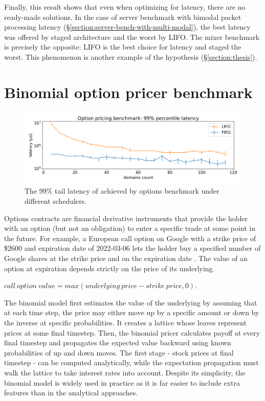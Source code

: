 \documentclass[12pt,a4paper,twoside]{report}
\begin{document}
Finally, this result shows that even when optimizing for latency, there are no ready-made solutions. In the case of server benchmark with bimodal packet processing latency (\S\ref{section:server-bench-with-multi-modal}), the best latency was offered by staged architecture and the worst by LIFO. The mixer benchmark is precisely the opposite: LIFO is the best choice for latency and staged the worst. This phenomenon is another example of the hypothesis (\S\ref{section:thesis}). 

\section{Binomial option pricer benchmark}
\label{section:binomial_option_pricer_result}

\begin{figure} 
    \centering 
    \includegraphics[width=1\textwidth]{eval/options-base.png}
    \caption{The 99\% tail latency of achieved by options benchmark under different schedulers.}
   \label{fig:options-bench}
\end{figure}
Options contracts are financial derivative instruments that provide the holder with an option (but not an obligation) to enter a specific trade at some point in the future. For example, a European call option on Google with a strike price of \$2600 and expiration date of 2022-03-06 lets the holder buy a specified number of Google shares at the strike price and on the expiration date \cite{Hull_John}. The value of an option at expiration depends strictly on the price of its underlying.

\begin{center}
$call\:option\:value = max(underlying\:price - strike\:price, 0)$.
\end{center}

The binomial model first estimates the value of the underlying by assuming that at each time step, the price may either move up by a specific amount or down by the inverse at specific probabilities. It creates a lattice whose leaves represent prices at some final timestep. Then, the binomial pricer calculates payoff at every final timestep and propagates the expected value backward using known probabilities of up and down moves. The first stage - stock prices at final timestep - can be computed analytically, while the expectation propagation must walk the lattice to take interest rates into account. Despite its simplicity, the binomial model is widely used in practice as it is far easier to include extra features than in the analytical approaches.
\end{document}

